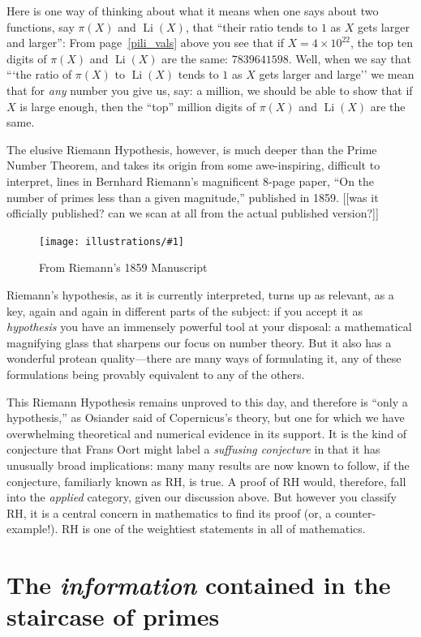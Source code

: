 \documentclass[11pt]{article}
\DeclareMathOperator{\Li}{Li}
\newcommand{\ill}[3]{ 
   \begin{figure}[htbp]
   \begin{center}
   \texttt{[image: illustrations/\#1]}
   \caption{#3}
   \end{center}
    \end{figure}
}
\theoremstyle{plain}
\theoremstyle{definition}
\numberwithin{equation}{section}
\numberwithin{figure}{section}
\numberwithin{table}{section}
\begin{document}
Here is one way of thinking about what it means when one says about
two functions, say $\pi(X)$ and $\Li(X)$, that ``their ratio tends to
$1$ as $X$ gets larger and larger'': From page~\ref{pili_vals} above
you see that if $X = 4\times 10^{22}$, the top ten digits of $\pi (X)$
and $\Li(X)$ are the same: $7839641598$.  Well, when we say that ```the
ratio of $\pi(X)$ to $\Li(X)$ tends to $1$ as $X$ gets larger and
large'' we mean that for {\em any} number you give us, say: a million,
we should be able to show that if $X$ is large enough, then the
``top'' million digits of $\pi (X)$ and $\Li(X)$ are the same.

The elusive Riemann Hypothesis, however, is much deeper than the Prime
Number Theorem, and takes its origin from some awe-inspiring,
difficult to interpret, lines in Bernhard Riemann's magnificent 8-page
paper, ``On the number of primes less than a given magnitude,''
published in 1859. [[was it officially published? can we scan at all from
the actual published version?]]
 

\ill{riemann_zoom}{1}{From Riemann's 1859 Manuscript\label{fig:riemamn}}

Riemann's hypothesis, as it is currently interpreted, turns up as
relevant, as a key, again and again in different parts of the subject:
if you accept it as {\em hypothesis} you have an immensely powerful
tool at your disposal: a mathematical magnifying glass that sharpens
our focus on number theory. But it also has a wonderful protean
quality---there are many ways of formulating it, any of these
formulations being provably equivalent to any of the others.

This Riemann Hypothesis remains unproved to this day, and therefore is
``only a hypothesis,'' as Osiander said of Copernicus's theory, but one
for which we have overwhelming theoretical and numerical evidence in
its support.  It is the kind of conjecture that Frans Oort might label
a {\em suffusing conjecture} in that it has unusually broad
implications: many many results are now known to follow, if the
conjecture, familiarly known as RH, is true. A proof of RH would,
therefore, fall into the {\em applied} category, given our discussion
above.  But however you classify RH, it is a central concern in
mathematics to find its proof (or, a counter-example!).  RH is 
one of the weightiest statements in all of mathematics. 


\section{The {\em information} contained in the staircase of primes}
 
\end{document}
